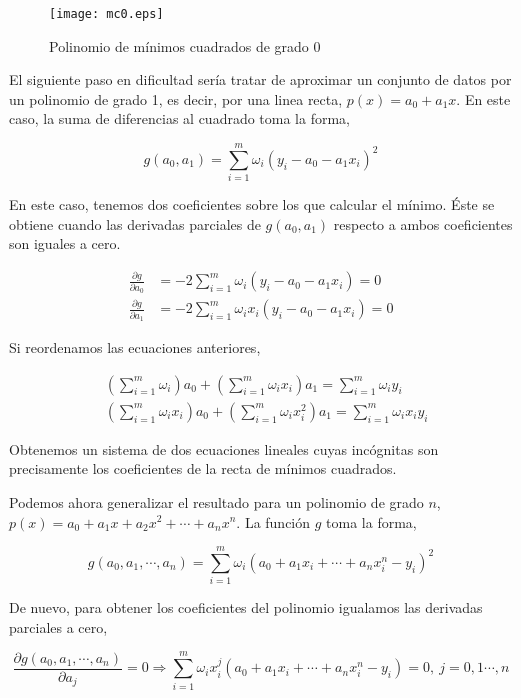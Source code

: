 \begin{figure}[h]
\centering
\texttt{[image: mc0.eps]}
\caption{Polinomio de mínimos cuadrados de grado 0} 
\label{fig:mc0}
\end{figure} 

El siguiente paso en dificultad sería tratar de aproximar un conjunto de datos por un polinomio de grado 1, es decir, por una linea recta, $p(x)=a_0+a_1 x$. En este caso, la suma de diferencias al cuadrado toma la forma,

\begin{equation*}
g(a_0,a_1)=\sum_{i=1}^m \omega_i\left(y_i-a_0-a_1 x_i \right)^2
\end{equation*}
 
En este caso, tenemos dos coeficientes sobre los que calcular el mínimo. Éste se obtiene cuando las derivadas parciales de $g(a_0,a_1)$ respecto a ambos coeficientes son iguales a cero. 

\begin{align*}
\frac{\partial g}{\partial a_0}&=-2\sum_{i=1}^m \omega_i (y_i-a_0-a_1 x_i) = 0\\
\frac{\partial g}{\partial a_1}&=-2\sum_{i=1}^m \omega_i x_i(y_i-a_0-a_1 x_i) = 0
\end{align*} 
 
Si reordenamos las ecuaciones anteriores, 

\begin{align*}
&\left(\sum_{i=1}^m \omega_i\right)a_0+ \left(\sum_{i=1}^m \omega_ix_i\right)a_1 =\sum_{i=1}^m \omega_iy_i\\
&\left(\sum_{i=1}^m \omega_ix_i\right)a_0+ \left(\sum_{i=1}^m \omega_ix_i^2\right)a_1 =\sum_{i=1}^m \omega_ix_iy_i
\end{align*}

Obtenemos un sistema de dos ecuaciones lineales cuyas incógnitas son precisamente los coeficientes de la recta de mínimos cuadrados.

Podemos ahora generalizar el resultado para un polinomio de grado $n$, $p(x)=a_0+a_1x+a_2x^2+\cdots +a_nx^n$. La función $g$ toma la forma,

\begin{equation*}
g(a_0,a_1,\cdots, a_n)=\sum_{i=1}^m \omega_i \left (a_0+a_1x_i+\cdots+ a_nx_i^n-y_i\right)^2
\end{equation*}

De nuevo, para obtener los coeficientes del polinomio igualamos las derivadas parciales a cero,

\begin{equation*}
\frac{\partial g(a_0,a_1,\cdots, a_n)}{\partial a_j}=0 \Rightarrow \sum_{i=1}^m \omega_i x_i^j \left( a_0+a_1x_i+\cdots + a_nx_i^n-y_i\right)=0, \ j=0,1\cdots, n
\end{equation*} 

